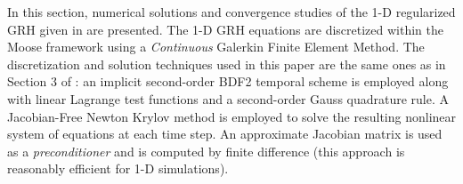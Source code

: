 \documentclass[times,doublespace]{fldauth}%
\begin{document}


In this section, numerical solutions and convergence studies of the 1-D regularized GRH given in  are presented.
The 1-D GRH equations are discretized within the Moose framework \cite{Moose} using a \emph{Continuous} Galerkin Finite Element Method.
The discretization and solution techniques used in this paper are the same ones as in Section 3 of \cite{our_jcp_radhy_paper}: an implicit second-order BDF2 temporal scheme is employed \cite{bdf2} along with linear Lagrange test functions and a second-order Gauss quadrature rule.
A Jacobian-Free Newton Krylov method \cite{JFNK} is employed to solve the resulting nonlinear system of equations at each time step.
An approximate Jacobian matrix is used as a \emph{preconditioner} and is computed by finite difference (this approach is reasonably efficient for 1-D simulations). 
\end{document}
